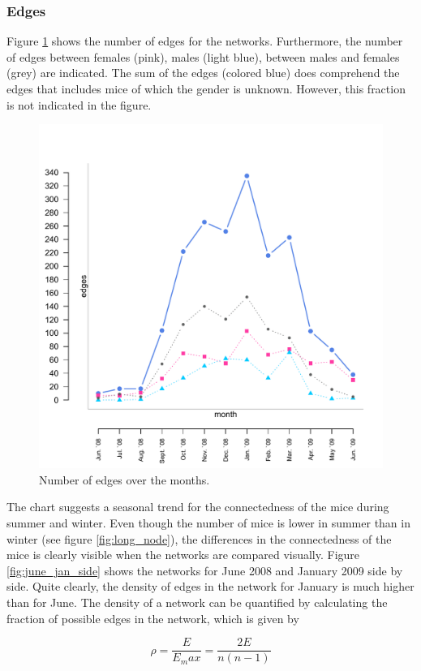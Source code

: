 \subsubsection{Edges}

Figure \ref{fig:long_edges} shows the number of edges for the networks. Furthermore, the number of edges between females (pink), males (light blue), between males and females (grey) are indicated. The sum of the edges (colored blue) does comprehend the edges that includes mice of which the gender is unknown. However, this fraction is not indicated in the figure.

\begin{figure}[htpb]
\begin{center}
  \includegraphics[width=.6\textwidth]{assets/pdf/long_edges.pdf}
  \caption[Number of edges over the months]{Number of edges over the months.}
  \label{fig:long_edges}
\end{center}
\end{figure}

The chart suggests a seasonal trend for the connectedness of the mice during summer and winter. Even though the number of mice is lower in summer than in winter (see figure \ref{fig:long_node}), the differences in the connectedness of the mice is clearly visible when the networks are compared visually. Figure \ref{fig:june_jan_side} shows the networks for June 2008 and January 2009 side by side. Quite clearly, the density of edges in the network for January is much higher than for June. The density of a network can be quantified by calculating the fraction of possible edges in the network, which is given by 

\begin{equation}
\rho = \frac{E}{E_max} = \frac{2E}{n(n-1)}
\label{eq:density}
\end{equation}      

